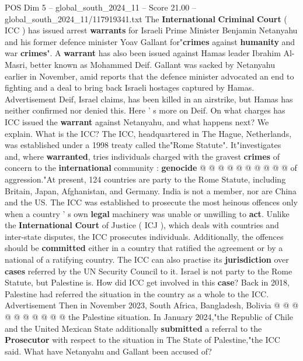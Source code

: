 \begin{textsample}{POS Dim 5 – global\_south\_2024\_11 – Score 21.00 – global\_south\_2024\_11/117919341.txt}  \label{ex:f5_pos_024}
The \textbf{International} \textbf{Criminal} \textbf{Court} ( ICC ) has issued arrest \textbf{warrants} for Israeli Prime Minister Benjamin Netanyahu and his former defence minister Yoav Gallant for"\textbf{crimes} against \textbf{humanity} and war \textbf{crimes}".
A \textbf{warrant} has also been issued against Hamas leader Ibrahim Al-Masri, better known as Mohammed Deif.
Gallant was sacked by Netanyahu earlier in November, amid reports that the defence minister advocated an end to fighting and a deal to bring back Israeli hostages captured by Hamas.
Advertisement Deif, Israel claims, has been killed in an airstrike, but Hamas has neither confirmed nor denied this.
Here ' s more on Deif.
On what charges has ICC issued the \textbf{warrant} against Netanyahu, and what happens next?
We explain.
What is the ICC?
The ICC, headquartered in The Hague, Netherlands, was established under a 1998 treaty called the"Rome Statute".
It"investigates and, where \textbf{warranted}, tries individuals charged with the gravest \textbf{crimes} of concern to the \textbf{international} community : \textbf{genocide} @ @ @ @ @ @ @ @ @ @ of aggression."At present, 124 countries are party to the Rome Statute, including Britain, Japan, Afghanistan, and Germany.
India is not a member, nor are China and the US.
The ICC was established to prosecute the most heinous offences only when a country ' s own \textbf{legal} machinery was unable or unwilling to \textbf{act}.
Unlike the \textbf{International} \textbf{Court} of Justice ( ICJ ), which deals with countries and inter-state disputes, the ICC prosecutes individuals.
Additionally, the offences should be \textbf{committed} either in a country that ratified the agreement or by a national of a ratifying country.
The ICC can also practise its \textbf{jurisdiction} over \textbf{cases} referred by the UN Security Council to it.
Israel is not party to the Rome Statute, but Palestine is.
How did ICC get involved in this \textbf{case}?
Back in 2018, Palestine had referred the situation in the country as a whole to the ICC.
Advertisement Then in November 2023, South Africa, Bangladesh, Bolivia @ @ @ @ @ @ @ @ @ @ the Palestine situation.
In January 2024,"the Republic of Chile and the United Mexican State additionally \textbf{submitted} a referral to the \textbf{Prosecutor} with respect to the situation in The State of Palestine,"the ICC said.
What have Netanyahu and Gallant been accused of?

\end{textsample}
